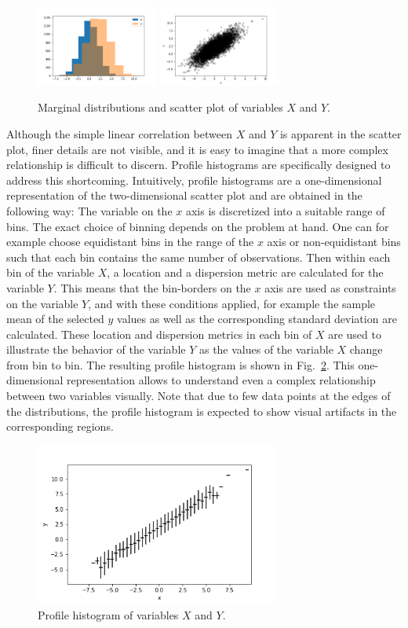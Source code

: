 \documentclass[BCOR=1mm, DIV=calc,10pt,
twoside=true,
twocolumn,
headings=normal]{scrartcl}
\newcommand{\fig}{Fig.~}
\begin{document}
\begin{figure}
\begin{center}
\includegraphics[width=4cm]{marginal}
\includegraphics[width=4cm]{scatter}
\caption{\label{fig:scatter} Marginal distributions and scatter plot of variables $X$ and $Y$.}
\end{center}
\end{figure}

Although the simple linear correlation between $X$ and $Y$ is apparent in the scatter plot, finer details are not visible, and it is easy to imagine that a more complex relationship is difficult to discern. Profile histograms are specifically designed to address this shortcoming. Intuitively, profile histograms are a one-dimensional representation of the two-dimensional scatter plot and are obtained  in the following way: The variable on the $x$ axis is discretized into a suitable range of bins. The exact choice of binning depends on the problem at hand. One can for example choose equidistant bins in the range of the $x$ axis or non-equidistant bins such that each bin contains the same number of observations. Then within each bin of the variable $X$, a location and a dispersion metric are calculated for the variable $Y$. This means that the bin-borders on the $x$ axis are used as constraints on the variable $Y$, and with these conditions applied, for example the sample mean of the selected $y$ values as well as the corresponding standard deviation are calculated. These location and dispersion metrics in each bin of $X$ are used to illustrate the behavior of the variable $Y$ as the values of the variable $X$ change from bin to bin. The resulting profile histogram is shown in \fig \ref{fig:profile}. This one-dimensional representation allows to understand even a complex relationship between two variables visually. Note that due to few data points at the edges of the distributions, the profile histogram is expected to show visual artifacts in the corresponding regions.

\begin{figure}
\begin{center}
\includegraphics[width=8cm]{profile}
\caption{\label{fig:profile} Profile histogram of variables $X$ and $Y$.}
\end{center}
\end{figure}
\end{document}
